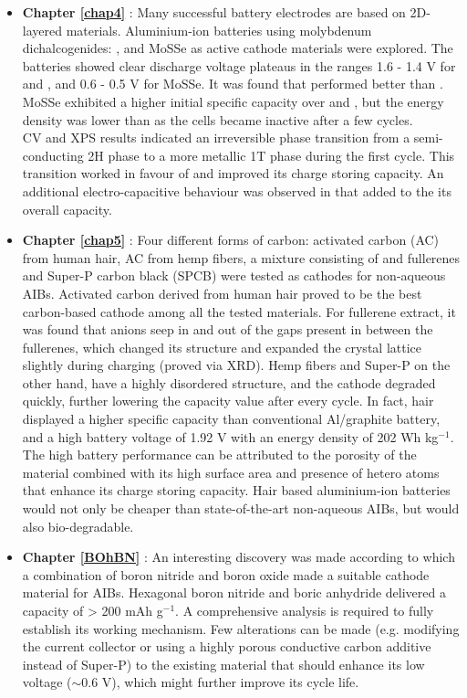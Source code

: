 \begin{itemize}

\item \textbf{Chapter \ref{chap4}} : Many successful battery electrodes are based on 2D-layered materials. Aluminium-ion batteries using molybdenum dichalcogenides: ,  and MoSSe as active cathode materials were explored. The batteries showed clear discharge voltage plateaus in the ranges 1.6 - 1.4 V for  and , and 0.6 - 0.5 V for MoSSe. It was found that  performed better than . MoSSe exhibited a higher initial specific capacity over  and , but the energy density was lower than  as the cells became inactive after a few cycles.  \\
CV and XPS results indicated an irreversible phase transition from a semi-conducting 2H phase to a more metallic 1T phase during the first cycle. This transition worked in favour of  and improved its charge storing capacity. An additional electro-capacitive behaviour was observed in  that added to the its overall capacity.

\item \textbf{Chapter \ref{chap5}} : Four different forms of carbon: activated carbon (AC) from human hair, AC from hemp fibers, a mixture consisting of  and  fullerenes and Super-P carbon black (SPCB) were tested as cathodes for non-aqueous AIBs. Activated carbon derived from human hair proved to be the best carbon-based cathode among all the tested materials. For fullerene extract, it was found that  anions seep in and out of the gaps present in between the fullerenes, which changed its structure and expanded the crystal lattice slightly during charging (proved via XRD). Hemp fibers and Super-P on the other hand, have a highly disordered structure, and the cathode degraded quickly, further lowering the capacity value after every cycle. In fact, hair displayed a higher specific capacity than conventional Al/graphite battery, and a high battery voltage of 1.92 V with an energy density of 202 Wh kg$^{-1}$. The high battery performance can be attributed to the porosity of the material combined with its high surface area and presence of hetero atoms that enhance its charge storing capacity. Hair based aluminium-ion batteries would not only be cheaper than state-of-the-art non-aqueous AIBs, but would also bio-degradable.

\item \textbf{Chapter \ref{BOhBN}} : An interesting discovery was made according to which a combination of boron nitride and boron oxide made a suitable cathode material for AIBs. Hexagonal boron nitride and boric anhydride delivered a capacity of > 200 mAh g$^{-1}$. A comprehensive analysis is required to fully establish its working mechanism. Few alterations can be made (e.g. modifying the current collector or using a highly porous conductive carbon additive instead of Super-P) to the existing material that should enhance its low voltage ($\sim$0.6 V), which might further improve its cycle life. 
\end{itemize}

